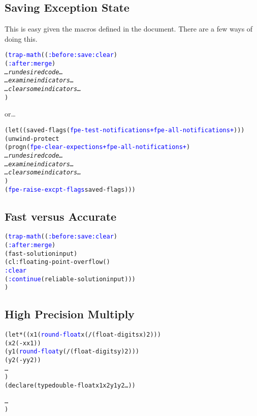 \documentclass[10pt,fleqn]{article}
\newcommand{\codelia}[1]{\textcolor{blue}{#1}}
\begin{document}
\subsection{Saving Exception State}

This is easy given the macros defined in the document.  There are a
few ways of doing this.

\begin{alltt}
    (\codelia{trap-math} ((\codelia{:before :save :clear})
                          (\codelia{:after :merge})
       \textit{\ldots run desired code \ldots}
       \textit{\ldots examine indicators \ldots}
       \textit{\ldots clear some indicators \ldots}
       )
\end{alltt}
or\ldots
\begin{alltt}
    (let ((saved-flags (\codelia{fpe-test-notifications +fpe-all-notifications+})))
       (unwind-protect
           (progn (\codelia{fpe-clear-expections +fpe-all-notifications+})
                  \textit{\ldots run desired code \ldots}
                  \textit{\ldots examine indicators \ldots}
                  \textit{\ldots clear some indicators \ldots}
                  )
         (\codelia{fpe-raise-excpt-flags} saved-flags)))
\end{alltt}


\subsection{Fast versus Accurate}

\begin{alltt}
    (\codelia{trap-math} ((\codelia{:before :save :clear})
                (\codelia{:after :merge})
      (fast-solution input)
      (cl:floating-point-overflow ()
         \codelia{:clear}
         (\codelia{:continue} (reliable-solution input)))
      )
\end{alltt}


\subsection{High Precision Multiply}

\begin{alltt}
    (let* ((x1 (\codelia{round-float} x (/ (float-digits x) 2)))
           (x2 (- x x1))
           (y1 (\codelia{round-float} y (/ (float-digits y) 2)))
           (y2 (- y y2))
           \ldots
           )
      (declare (type double-float x1 x2 y1 y2 \ldots))

      \ldots
      )
\end{alltt}
\end{document}
